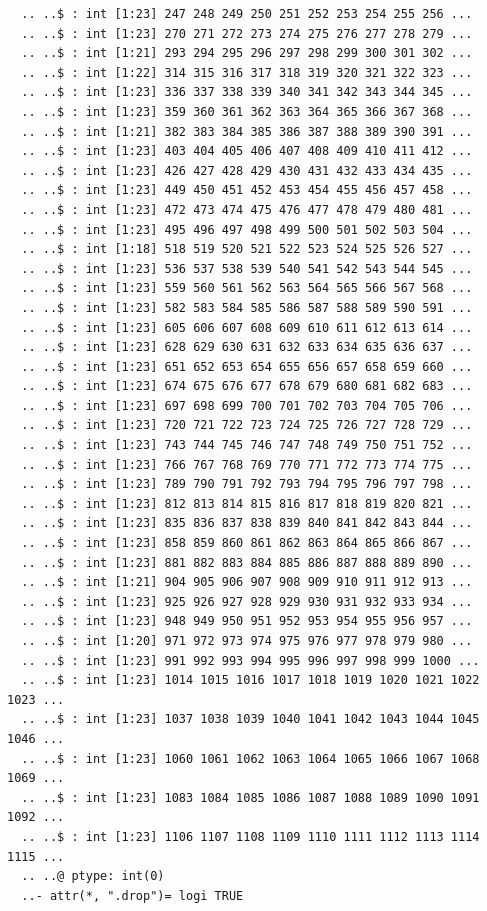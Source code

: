 \documentclass[
  12pt,
]{article}
\begin{document}
\begin{verbatim}
  .. ..$ : int [1:23] 247 248 249 250 251 252 253 254 255 256 ...
  .. ..$ : int [1:23] 270 271 272 273 274 275 276 277 278 279 ...
  .. ..$ : int [1:21] 293 294 295 296 297 298 299 300 301 302 ...
  .. ..$ : int [1:22] 314 315 316 317 318 319 320 321 322 323 ...
  .. ..$ : int [1:23] 336 337 338 339 340 341 342 343 344 345 ...
  .. ..$ : int [1:23] 359 360 361 362 363 364 365 366 367 368 ...
  .. ..$ : int [1:21] 382 383 384 385 386 387 388 389 390 391 ...
  .. ..$ : int [1:23] 403 404 405 406 407 408 409 410 411 412 ...
  .. ..$ : int [1:23] 426 427 428 429 430 431 432 433 434 435 ...
  .. ..$ : int [1:23] 449 450 451 452 453 454 455 456 457 458 ...
  .. ..$ : int [1:23] 472 473 474 475 476 477 478 479 480 481 ...
  .. ..$ : int [1:23] 495 496 497 498 499 500 501 502 503 504 ...
  .. ..$ : int [1:18] 518 519 520 521 522 523 524 525 526 527 ...
  .. ..$ : int [1:23] 536 537 538 539 540 541 542 543 544 545 ...
  .. ..$ : int [1:23] 559 560 561 562 563 564 565 566 567 568 ...
  .. ..$ : int [1:23] 582 583 584 585 586 587 588 589 590 591 ...
  .. ..$ : int [1:23] 605 606 607 608 609 610 611 612 613 614 ...
  .. ..$ : int [1:23] 628 629 630 631 632 633 634 635 636 637 ...
  .. ..$ : int [1:23] 651 652 653 654 655 656 657 658 659 660 ...
  .. ..$ : int [1:23] 674 675 676 677 678 679 680 681 682 683 ...
  .. ..$ : int [1:23] 697 698 699 700 701 702 703 704 705 706 ...
  .. ..$ : int [1:23] 720 721 722 723 724 725 726 727 728 729 ...
  .. ..$ : int [1:23] 743 744 745 746 747 748 749 750 751 752 ...
  .. ..$ : int [1:23] 766 767 768 769 770 771 772 773 774 775 ...
  .. ..$ : int [1:23] 789 790 791 792 793 794 795 796 797 798 ...
  .. ..$ : int [1:23] 812 813 814 815 816 817 818 819 820 821 ...
  .. ..$ : int [1:23] 835 836 837 838 839 840 841 842 843 844 ...
  .. ..$ : int [1:23] 858 859 860 861 862 863 864 865 866 867 ...
  .. ..$ : int [1:23] 881 882 883 884 885 886 887 888 889 890 ...
  .. ..$ : int [1:21] 904 905 906 907 908 909 910 911 912 913 ...
  .. ..$ : int [1:23] 925 926 927 928 929 930 931 932 933 934 ...
  .. ..$ : int [1:23] 948 949 950 951 952 953 954 955 956 957 ...
  .. ..$ : int [1:20] 971 972 973 974 975 976 977 978 979 980 ...
  .. ..$ : int [1:23] 991 992 993 994 995 996 997 998 999 1000 ...
  .. ..$ : int [1:23] 1014 1015 1016 1017 1018 1019 1020 1021 1022 1023 ...
  .. ..$ : int [1:23] 1037 1038 1039 1040 1041 1042 1043 1044 1045 1046 ...
  .. ..$ : int [1:23] 1060 1061 1062 1063 1064 1065 1066 1067 1068 1069 ...
  .. ..$ : int [1:23] 1083 1084 1085 1086 1087 1088 1089 1090 1091 1092 ...
  .. ..$ : int [1:23] 1106 1107 1108 1109 1110 1111 1112 1113 1114 1115 ...
  .. ..@ ptype: int(0) 
  ..- attr(*, ".drop")= logi TRUE
\end{verbatim}
\end{document}
